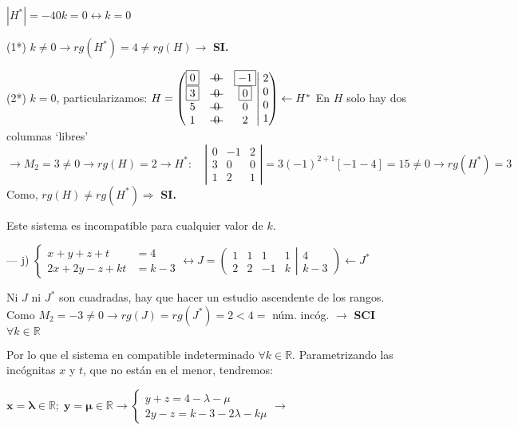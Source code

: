 \begin{proofw}
\noindent $|H^*|=-40k=0 \leftrightarrow k=0$

\noindent (1*) $k\neq 0 \to rg(H^*)=4\neq rg(H) \to$ \textbf{ SI.}

\noindent (2*) $k=0$, particularizamos: $H=\left( \begin{matrix}   \boxed{0}&\text{\textst{ 0 }}&\boxed{-1}\\\boxed{3}&\text{\textst{ 0 }}&\boxed{0}\\5&\text{\textst{ 0 }}&0\\1&\text{\textst{ 0 }}&2     \end{matrix} \right|  \left.    \begin{matrix}   2\\0\\0\\1 \end{matrix} \right) \leftarrow H^*$ En $H$ solo hay dos columnas `libres' $\to \boxed{M_2}=3\neq 0 \to rg(H)=2 \to H^*: \quad \left| \begin{matrix} 0&-1&2\\3&0&0\\1&2&1 \end{matrix} \right|=3(-1)^{2+1}[-1-4]=15\neq 0 \to rg(H^*)=3$ Como, $rg(H)\neq rg(H^*) \Rightarrow $ \textbf{ SI.}

\noindent Este sistema es incompatible para cualquier valor de $k$.


\noindent --- j) $\begin{cases}  x+y+z+t&=4\\2x+2y-z+kt&=k-3   \end{cases} \leftrightarrow J=\left( \begin{matrix}   1&\boxed{1}&\boxed{1}&1 \\ 2&\boxed{2}&\boxed{-1}&k    \end{matrix} \right|  \left.    \begin{matrix}  4\\k-3  \end{matrix} \right) \leftarrow J^*$

\noindent Ni $J$ ni $J^*$ son cuadradas, hay que hacer un estudio ascendente de los rangos. Como $\boxed{M_2}=-3\neq 0 \to rg(J)=rg(J^*)=2<4=$ núm. incóg. $\to$ \textbf{SCI} $\forall k\in \mathbb R$

\noindent Por lo que el sistema en compatible indeterminado $\forall k\in \mathbb R$. Parametrizando las incógnitas $x$ y $t$, que no están en el menor, tendremos: 

\noindent $\boldsymbol{ x=\lambda \in \mathbb R; \; y=\mu \in \mathbb R} \to \begin{cases} y+z=4-\lambda - \mu \\ 2y-z=k-3-2\lambda-k\mu \end{cases} \longrightarrow $


\end{proofw}
